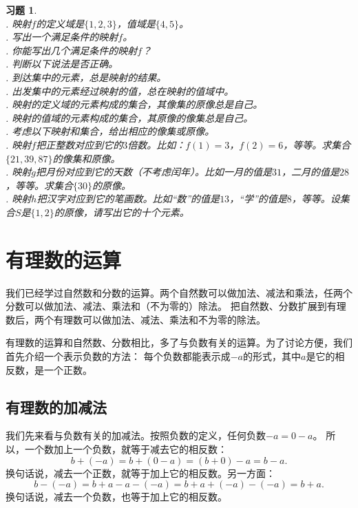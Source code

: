 \documentclass[12pt,UTF8]{ctexbook}
\theoremstyle{definition}
\theoremstyle{plain}
\newtheorem{xt}{习题}[section]
\begin{document}
\begin{xt}\label{xt:2-2-0}
    \mbox{} \\
    . 映射$f$的定义域是$\{1,2,3\}$，值域是$\{4,5\}$。\\
    . 写出一个满足条件的映射$f$。\\
    . 你能写出几个满足条件的映射$f$？\\
    . 判断以下说法是否正确。\\
    . 到达集中的元素，总是映射的结果。\\
    . 出发集中的元素经过映射的值，总在映射的值域中。\\
    . 映射的定义域的元素构成的集合，其像集的原像总是自己。\\
    . 映射的值域的元素构成的集合，其原像的像集总是自己。\\
    . 考虑以下映射和集合，给出相应的像集或原像。\\
    . 映射$f$把正整数对应到它的$3$倍数。比如：$f(1) = 3$，$f(2) = 6$，等等。求集合$\{21, 39, 87\}$的像集和原像。\\
    . 映射$g$把月份对应到它的天数（不考虑闰年）。比如一月的值是$31$，二月的值是$28$，等等。求集合$\{30\}$的原像。\\
    . 映射$h$把汉字对应到它的笔画数。比如“数”的值是$13$，“学”的值是$8$，等等。设集合$S$是$\{1,2\}$的原像，请写出它的十个元素。 %
\end{xt}

\chapter{有理数的运算}
我们已经学过自然数和分数的运算。两个自然数可以做加法、减法和乘法，任两个分数可以做加法、减法、乘法和（不为零的）除法。
把自然数、分数扩展到有理数后，两个有理数可以做加法、减法、乘法和不为零的除法。

有理数的运算和自然数、分数相比，多了与负数有关的运算。为了讨论方便，我们首先介绍一个表示负数的方法：
每个负数都能表示成$-a$的形式，其中$a$是它的相反数，是一个正数。

\section{有理数的加减法}
我们先来看与负数有关的加减法。按照负数的定义，任何负数$-a = 0 - a$。
所以，一个数加上一个负数，就等于减去它的相反数：
$$ b + (-a) = b + (0 - a) = (b + 0) - a = b - a.$$
换句话说，减去一个正数，就等于加上它的相反数。另一方面：
$$ b - (-a) = b + a - a - (-a) = b + a + (-a) - (-a) = b + a.$$
换句话说，减去一个负数，也等于加上它的相反数。
\end{document}
